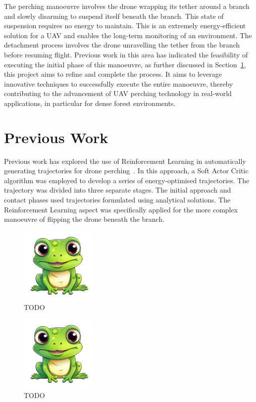 The perching manoeuvre involves the drone wrapping its tether around a branch and slowly disarming to suspend itself beneath the branch. 
This state of suspension requires no energy to maintain. 
This is an extremely energy-efficient solution for a UAV and enables  the long-term monitoring of an environment. 
The detachment process involves the drone unravelling the tether from the branch before resuming flight. 
Previous work in this area has indicated the feasibility of executing the initial phase of this manoeuvre, as further discussed in Section~\ref{sec:background-prev-work}, this project aims to refine and complete the process. 
It aims to leverage innovative techniques to successfully execute the entire manoeuvre, thereby contributing to the advancement of UAV perching technology in real-world applications, in particular for dense forest environments.

\section{Previous Work}
\label{sec:background-prev-work}


Previous work has explored the use of Reinforcement Learning in automatically generating trajectories for drone perching~\cite{learnedTetheredPerchingFabian}.
In this approach, a Soft Actor Critic algorithm was employed to develop a series of energy-optimised trajectories.
The trajectory was divided into three separate stages.
The initial approach and contact phases used trajectories formulated using analytical solutions.
The Reinforcement Learning aspect was specifically applied for the more complex manoeuvre of flipping the drone beneath the branch.

\begin{figure}[htbp]
  \centering
  \includegraphics[width=0.33\textwidth]{frog.png}
  \caption{TODO}
\label{fig:previous-work-manuever-diagram}
\end{figure}

\begin{figure}[htbp]
  \centering
  \includegraphics[width=0.33\textwidth]{frog.png}
  \caption{TODO}
\label{fig:previous-work-rolling}
\end{figure}

